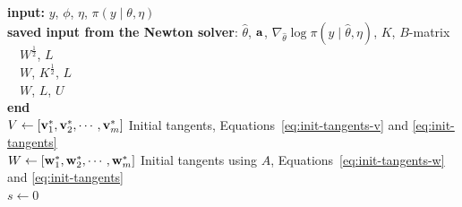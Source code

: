 \documentclass[stslayout, noinfoline]{imsart}
\theoremstyle{definition}
\begin{document}
\begin{algorithm}
   \caption{General adjoint-differentiation. \textit{Note: additional specialized steps can be taken in the case where $W$ or $K$ is diagonal.}}
   \label{algo:general-adjoint}
    \textbf{input:} $y$, $\phi$, $\eta$, $\pi(y \mid \theta, \eta)$ \\
    \textbf{saved input from the  Newton solver}: $\hat \theta$, ${\bf a}$, $\nabla_{\hat \theta} \log \pi(y \mid \hat \theta, \eta)$, $K$, $B$-matrix \\
    \ \ $W^\frac{1}{2}$, $L$  \\
    \ \ $W$, $K^\frac{1}{2}$, $L$  \\
    \ \ $W$, $L$, $U$  \\
    \textbf{end} \\
    $V \gets [{\bf v}^*_1, {\bf v}^*_2, \cdots, {\bf v}^*_m]$  \Comment Initial tangents, Equations~\ref{eq:init-tangents-v} and \ref{eq:init-tangents} \\
    $W \gets [{\bf w}^*_1, {\bf w}^*_2, \cdots, {\bf w}^*_m]$ \Comment Initial tangents using $A$, Equations~\ref{eq:init-tangents-w} and \ref{eq:init-tangents} \\
    $s \gets 0$ \\
\end{algorithm}
\end{document}
